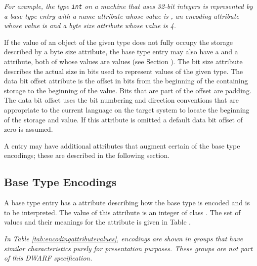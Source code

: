 \textit{For example, the 
 type \texttt{int} on a machine that uses 32-bit
integers is represented by a base type entry with a name
attribute whose value is , an encoding attribute
whose value is \DWATEsigned{}
and a byte size attribute whose value is 4.}

If the value of an object of the given type does not fully
occupy the storage described by a byte size 
attribute,\hypertarget{chap:DWATdatabitoffsetbasetypebitlocation}{}
the base type entry may also have a 
\DWATbitsizeDEFN{} and a \DWATdatabitoffsetDEFN{} attribute,
both of whose values are
 values
(see Section ). 
The bit size
attribute describes the actual size in bits used to represent
values of the given type. The data bit offset attribute is the
offset in bits from the beginning of the containing storage to
the beginning of the value. Bits that are part of the offset
are padding. The data bit offset uses the bit numbering and
direction conventions that are appropriate to the current
language on the
target system to locate the beginning of the storage and
value. If this attribute is omitted a default data bit offset
of zero is assumed.

A \DWTAGbasetype{} entry may have additional attributes that
augment certain of the base type encodings; these are described
in the following section.

\subsection{Base Type Encodings}
\label{chap:basetypeencodings}
A base type entry has 
a \DWATencoding{} attribute describing
how the base type is encoded and is to be interpreted. The 
value of this attribute is an integer of class \CLASSconstant.
The set of values and their meanings for the
\DWATencoding{} attribute is given in 
Table .

\textit{In Table \ref{tab:encodingattributevalues}, encodings
are shown in groups that have similar characteristics purely
for presentation purposes. These groups are not part of this
DWARF specification.}

